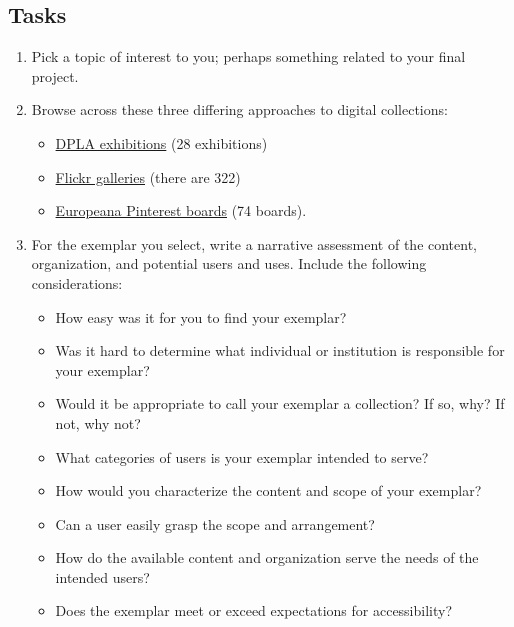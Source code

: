 \documentclass[]{article}
\providecommand{\tightlist}{%
  \setlength{\itemsep}{0pt}\setlength{\parskip}{0pt}}
\begin{document}
\subsection{Tasks}\label{tasks-1}

\begin{enumerate}
\def\labelenumi{\arabic{enumi}.}
\tightlist
\item
  Pick a topic of interest to you; perhaps something related to your
  final project.
\item
  Browse across these three differing approaches to digital collections:

  \begin{itemize}
  \tightlist
  \item
    \href{http://dp.la/exhibitions}{DPLA exhibitions} (28 exhibitions)
  \item
    \href{https://www.flickr.com/photos/flickr/galleries}{Flickr
    galleries} (there are 322)
  \item
    \href{https://www.pinterest.com/europeana/}{Europeana Pinterest
    boards} (74 boards).
  \end{itemize}
\item
  For the exemplar you select, write a narrative assessment of the
  content, organization, and potential users and uses. Include the
  following considerations:

  \begin{itemize}
  \tightlist
  \item
    How easy was it for you to find your exemplar?
  \item
    Was it hard to determine what individual or institution is
    responsible for your exemplar?
  \item
    Would it be appropriate to call your exemplar a collection? If so,
    why? If not, why not?
  \item
    What categories of users is your exemplar intended to serve?
  \item
    How would you characterize the content and scope of your exemplar?
  \item
    Can a user easily grasp the scope and arrangement?
  \item
    How do the available content and organization serve the needs of the
    intended users?
  \item
    Does the exemplar meet or exceed expectations for accessibility?
  \end{itemize}
\end{enumerate}
\end{document}
